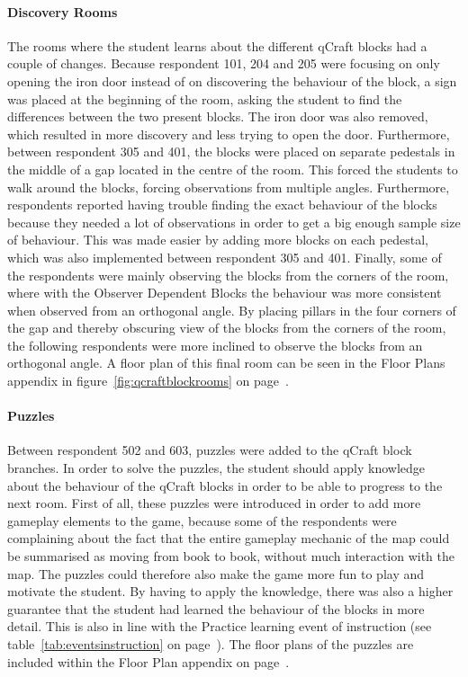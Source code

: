 \documentclass[11pt,twoside]{report} %
\begin{document}
\paragraph{Discovery Rooms}

The rooms where the student learns about the different qCraft blocks had a couple of changes. Because respondent 101, 204 and 205 were focusing on only opening the iron door instead of on discovering the behaviour of the block, a sign was placed at the beginning of the room, asking the student to find the differences between the two present blocks. The iron door was also removed, which resulted in more discovery and less trying to open the door. Furthermore, between respondent 305 and 401, the blocks were placed on separate pedestals in the middle of a gap located in the centre of the room. This forced the students to walk around the blocks, forcing observations from multiple angles. Furthermore, respondents reported having trouble finding the exact behaviour of the blocks because they needed a lot of observations in order to get a big enough sample size of behaviour. This was made easier by adding more blocks on each pedestal, which was also implemented between respondent 305 and 401. Finally, some of the respondents were mainly observing the blocks from the corners of the room, where with the Observer Dependent Blocks the behaviour was more consistent when observed from an orthogonal angle. By placing pillars in the four corners of the gap and thereby obscuring view of the blocks from the corners of the room, the following respondents were more inclined to observe the blocks from an orthogonal angle. A floor plan of this final room can be seen in the Floor Plans appendix in figure~\ref{fig:qcraftblockrooms} on page~\pageref{fig:qcraftblockrooms}.

\paragraph{Puzzles}

Between respondent 502 and 603, puzzles were added to the qCraft block branches. In order to solve the puzzles, the student should apply knowledge about the behaviour of the qCraft blocks in order to be able to progress to the next room. First of all, these puzzles were introduced in order to add more gameplay elements to the game, because some of the respondents were complaining about the fact that the entire gameplay mechanic of the map could be summarised as moving from book to book, without much interaction with the map. The puzzles could therefore also make the game more fun to play and motivate the student. By having to apply the knowledge, there was also a higher guarantee that the student had learned the behaviour of the blocks in more detail. This is also in line with the Practice learning event of instruction (see table~\ref{tab:eventsinstruction} on page~\pageref{tab:eventsinstruction}). The floor plans of the puzzles are included within the Floor Plan appendix on page~\pageref{app:floorplans}.
\end{document}
